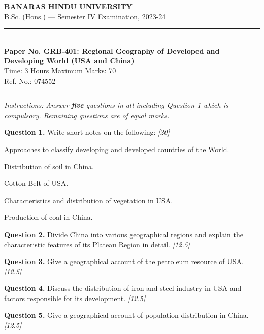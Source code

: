 \documentclass[11pt,a4paper]{article}
\newcommand{\pts}[1]{\hfill   \textit{[#1]}}
\begin{document}
\begin{center}
  {\large\bfseries BANARAS HINDU UNIVERSITY}\\[2pt]
  {\normalsize B.Sc. (Hons.) --- Semester IV Examination, 2023-24}\\[6pt]
  \rule{0.8\linewidth}{0.5pt}\\[6pt]
  {\large\bfseries Paper No. GRB-401: Regional Geography of Developed and Developing World (USA and China)}\\[4pt]
  {\normalsize Time: 3 Hours \hfill Maximum Marks: 70}\\[2pt]
  {\small Ref. No.: 074552}
\end{center}
\rule{\linewidth}{0.4pt}
\smallskip



\noindent   \textit{Instructions: Answer   \textbf{five} questions in all including Question 1 which is compulsory. Remaining questions are of equal marks.}
\bigskip




\noindent   \textbf{Question 1.} Write short notes on the following: \pts{20}

\begin{parts}
  \item Approaches to classify developing and developed countries of the World.
  \item Distribution of soil in China.
  \item Cotton Belt of USA.
  \item Characteristics and distribution of vegetation in USA.
  \item Production of coal in China.
\end{parts}

\medskip


\noindent   \textbf{Question 2.} Divide China into various geographical regions and explain the characteristic features of its Plateau Region in detail. \pts{12.5}

\medskip


\noindent   \textbf{Question 3.} Give a geographical account of the petroleum resource of USA. \pts{12.5}

\medskip


\noindent   \textbf{Question 4.} Discuss the distribution of iron and steel industry in USA and factors responsible for its development. \pts{12.5}

\medskip


\noindent   \textbf{Question 5.} Give a geographical account of population distribution in China. \pts{12.5}
\end{document}

